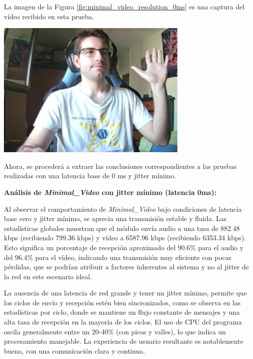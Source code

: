 \newpage
La imagen de la Figura \ref{fig:minimal_video_resolution_0ms} es una captura del vídeo recibido en esta prueba.
\begin{center}
  \includegraphics[width = 0.7\textwidth]{images/VideoRecibido4.3.png}
  \label{fig:minimal_video_resolution_0ms}
\end{center}

\newpage

Ahora, se procederá a extraer las conclusiones correspondientes a las pruebas realizadas con una latencia base de 0 ms y jitter mínimo.
\vspace{\baselineskip}

\textbf{Análisis de \textit{Minimal\_Video} con jitter mínimo (latencia 0ms):}
\vspace{\baselineskip}

Al observar el comportamiento de \textit{Minimal\_Video} bajo condiciones de latencia base cero y jitter mínimo, se aprecia una transmisión estable y fluida. Las estadísticas globales muestran que el módulo envía audio a una tasa de 882.48 kbps (recibiendo 799.36 kbps) y vídeo a 6587.96 kbps (recibiendo 6353.34 kbps). Esto significa un porcentaje de recepción aproximado del 90.6\% para el audio y del 96.4\% para el vídeo, indicando una transmisión muy eficiente con pocas pérdidas, que se podrían atribuir a factores inherentes al sistema y no al jitter de la red en este escenario ideal.
\vspace{\baselineskip}

La ausencia de una latencia de red grande y tener un jitter mínimo, permite que los ciclos de envío y recepción estén bien sincronizados, como se observa en las estadísticas por ciclo, donde se mantiene un flujo constante de mensajes y una alta tasa de recepción en la mayoría de los ciclos. El uso de CPU del programa oscila generalmente entre un 20-40\% (con picos y valles), lo que indica un procesamiento manejable. La experiencia de usuario resultante es notablemente buena, con una comunicación clara y continua.

